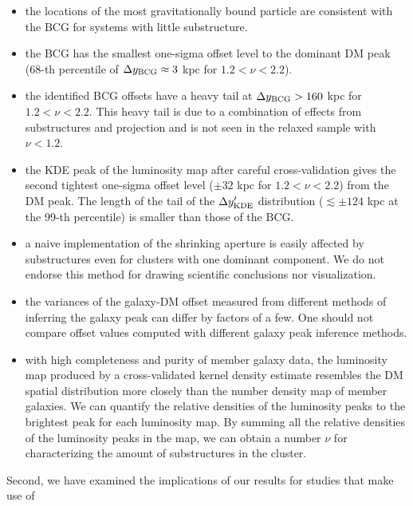 \begin{itemize}
		\item the locations of the most gravitationally bound particle are consistent 
				with the BCG for systems with little substructure.  

		\item the BCG has the smallest one-sigma offset level to the dominant DM
			peak (68-th percentile of $\Delta y_{\rm BCG} \approx 3$ kpc for $1.2 <
			\nu < 2.2$).

		\item the identified BCG offsets have a heavy tail at $\Delta y_{\rm BCG} >
			160$ kpc for $1.2 < \nu < 2.2$. 
		 This heavy tail is due to a combination of effects from substructures and 
		 projection and is not seen in the relaxed sample with $\nu < 1.2$. 

		\item the KDE peak of the luminosity map after careful cross-validation 
			gives the second tightest one-sigma offset level ($\pm 32$ kpc for $1.2 <
			\nu < 2.2$) from the DM peak.  
			The length of the tail of the $\Delta y_{\rm KDE}'$ distribution
			($\lesssim \pm 124$ kpc at the 99-th percentile)
			is smaller than those of the BCG.

		\item a naive implementation of the shrinking aperture is easily affected 
			by substructures even for clusters with one
			dominant component. We do not endorse this method for drawing scientific
			conclusions nor visualization.

		\item the variances of the galaxy-DM offset measured from different methods
			of inferring the galaxy peak can differ by factors of a few. 
			One should not compare
			offset values computed with different galaxy peak inference methods.

		\item with high completeness and purity of member galaxy data, the
			luminosity map produced by a cross-validated kernel density estimate 
			resembles the DM spatial distribution more closely than 
			the number density map of member galaxies. We can quantify the relative
			densities of the luminosity peaks to the brightest peak for each 
			luminosity map. By summing all the relative densities of the luminosity
			peaks in the map, we can obtain a number $\nu$ for characterizing the amount of substructures in
			the cluster. 
\end{itemize}
Second, we have examined the implications of our results for studies that make use of
